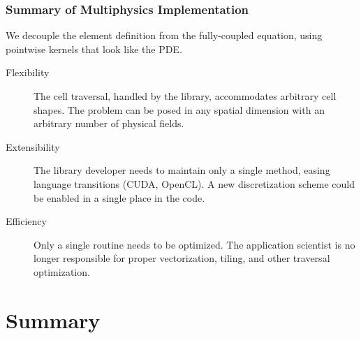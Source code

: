 \documentclass[aspectratio=169,hyperref=colorlinks]{beamer}
\begin{document}
\begin{frame}
  \frametitle{Summary of Multiphysics Implementation}
  \summary{}

  We decouple the element definition from the fully-coupled equation,
  using pointwise kernels that look like the PDE.

  \vfill    
  \begin{description}
  \item[Flexibility] The cell traversal, handled by the library,
    accommodates arbitrary cell shapes. The problem can be posed
    in any spatial dimension with an arbitrary number of
    physical fields.
  \item[Extensibility] The library developer needs to maintain only a
    single method, easing language transitions (CUDA, OpenCL). A new
    discretization scheme could be enabled in a single place in the
    code.
  \item[Efficiency] Only a single routine needs to be
    optimized. The application scientist is no longer
    responsible for proper vectorization, tiling, and other
    traversal optimization.
  \end{description}

\end{frame}

\section{Summary}
\end{document}
